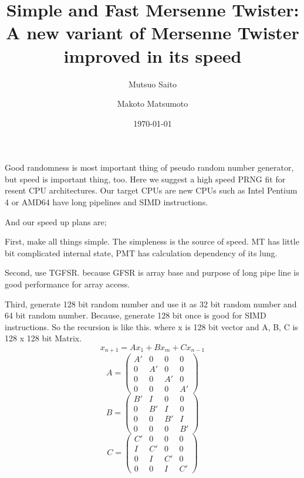 \documentclass{amsart}
\theoremstyle{definition}
\begin{document}
\title[Simple and Fast MT]
{Simple and Fast Mersenne Twister: A new variant of Mersenne Twister
improved in its speed} 

\author{Mutsuo Saito}
\address{Department of Mathematics \\ Hiroshima University\\
Hiroshima 739-8526, JAPAN}

\author{Makoto Matsumoto}
\address{Department of Mathematics \\ Hiroshima University\\
Hiroshima 739-8526, JAPAN}

\date{\today}


\maketitle

Good randomness is most important thing of pseudo random number
generator, but speed is important thing, too.
Here we suggest a high speed PRNG fit for resent CPU
architectures.
Our target CPUs are new CPUs such as Intel Pentium 4 or AMD64 have
long pipelines and SIMD instructions.

And our speed up plans are;

First, make all things simple. The simpleness is the source of
speed. MT has little bit complicated internal state, PMT has
calculation dependency of its lung.

Second, use TGFSR. because GFSR is array base and 
purpose of long pipe line is good performance for array access.

Third, generate 128 bit random number and use it as 32 bit
random number and 64 bit random number. Because,
generate 128 bit once is good for SIMD instructions.
So the recursion is like this. where x is 128 bit vector and
A, B, C is 128 x 128 bit Matrix.
\[x_{n+1} = Ax_1 + Bx_m + Cx_{n-1}\]
\[A = \left( \begin{array}{cccc}
    A' & 0 & 0 & 0 \\
    0 & A' & 0 & 0 \\
    0 & 0 & A' & 0 \\
    0 & 0 & 0 & A' \end{array} \right) \]
\[B = \left( \begin{array}{cccc}
    B' & I & 0 & 0 \\
    0 & B' & I & 0 \\
    0 & 0 & B' & I \\
    0 & 0 & 0 & B' \end{array} \right) \]
\[C = \left( \begin{array}{cccc}
    C' & 0 & 0 & 0 \\
    I & C' & 0 & 0 \\
    0 & I & C' & 0 \\
    0 & 0 & I & C' \end{array} \right) \]
\end{document}
